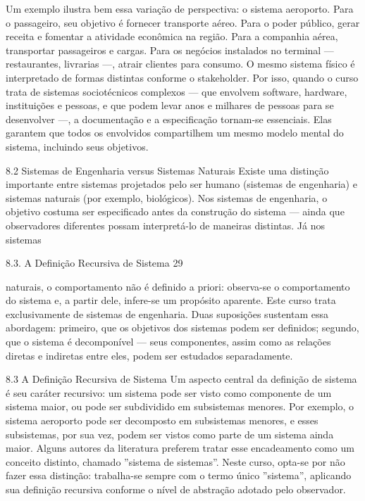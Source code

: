 Um exemplo ilustra bem essa variação de perspectiva: o sistema aeroporto. Para o passageiro, seu objetivo é fornecer transporte aéreo. Para o poder público, gerar receita e fomentar a atividade econômica na região. Para a companhia aérea, transportar passageiros e cargas. Para os negócios instalados no terminal — restaurantes, livrarias —, atrair clientes para consumo. O mesmo sistema físico é interpretado de formas distintas conforme o stakeholder. Por isso, quando o curso trata de sistemas sociotécnicos complexos — que envolvem software, hardware, instituições e pessoas, e que podem levar anos e milhares de pessoas para se desenvolver —, a documentação e a especificação tornam-se essenciais. Elas garantem que todos os envolvidos compartilhem um mesmo modelo mental do sistema, incluindo seus objetivos.

8.2 Sistemas de Engenharia versus Sistemas Naturais Existe uma distinção importante entre sistemas projetados pelo ser humano (sistemas de engenharia) e sistemas naturais (por exemplo, biológicos). Nos sistemas de engenharia, o objetivo costuma ser especificado antes da construção do sistema — ainda que observadores diferentes possam interpretá-lo de maneiras distintas. Já nos sistemas

8.3. A Definição Recursiva de Sistema 29

naturais, o comportamento não é definido a priori: observa-se o comportamento do sistema e, a partir dele, infere-se um propósito aparente. Este curso trata exclusivamente de sistemas de engenharia. Duas suposições sustentam essa abordagem: primeiro, que os objetivos dos sistemas podem ser definidos; segundo, que o sistema é decomponível — seus componentes, assim como as relações diretas e indiretas entre eles, podem ser estudados separadamente.

8.3 A Definição Recursiva de Sistema Um aspecto central da definição de sistema é seu caráter recursivo: um sistema pode ser visto como componente de um sistema maior, ou pode ser subdividido em subsistemas menores. Por exemplo, o sistema aeroporto pode ser decomposto em subsistemas menores, e esses subsistemas, por sua vez, podem ser vistos como parte de um sistema ainda maior. Alguns autores da literatura preferem tratar esse encadeamento como um conceito distinto, chamado ”sistema de sistemas”. Neste curso, opta-se por não fazer essa distinção: trabalha-se sempre com o termo único ”sistema”, aplicando sua definição recursiva conforme o nível de abstração adotado pelo observador.

